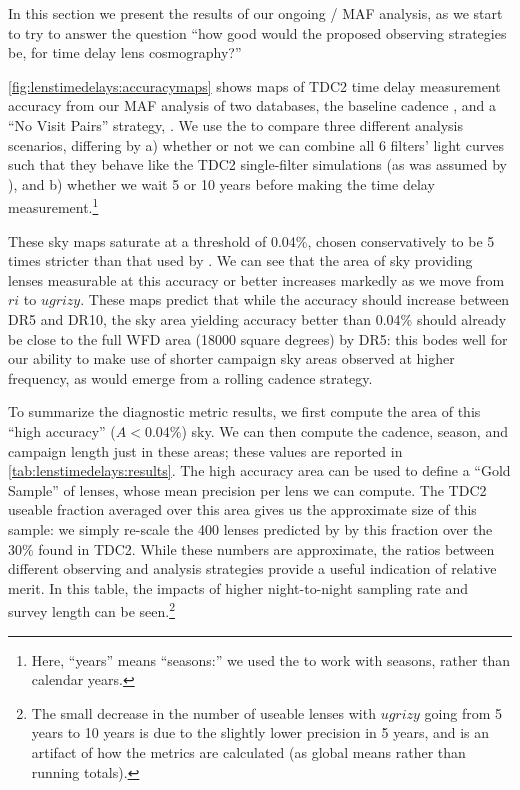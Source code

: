 
In this section we present the results of our ongoing \OpSim / MAF
analysis, as we start to try to
answer the question ``how good would the proposed observing
strategies be, for time delay lens cosmography?''

\autoref{fig:lenstimedelays:accuracymaps} shows maps of TDC2 time delay
measurement accuracy from our MAF analysis of two \OpSim databases, the
baseline cadence , and a ``No Visit Pairs''
strategy, . We use the  to compare three different
analysis scenarios, differing by a) whether or not we can combine all 6
filters' light curves such that they behave like the TDC2 single-filter
simulations (as was assumed by \citeauthor{LiaoEtal2015}), and b)
whether we wait 5 or 10 years before making the time delay measurement.\footnote{Here, ``years'' means ``seasons:'' we used the
 to work
with seasons, rather than calendar years.}

These sky maps saturate at a threshold of 0.04\%, chosen conservatively
to be 5 times stricter than that used by
\citeauthor{Hojjati+Linder2014}. We can see that the area of sky
providing lenses measurable at this accuracy or better increases
markedly as we move from $ri$ to $ugrizy$. These maps predict that while
the accuracy should increase between DR5 and DR10, the sky area yielding
accuracy better than 0.04\% should already be close to the full WFD area
(18000 square degrees) by DR5: this bodes well for our ability to make
use of shorter campaign sky areas observed at higher frequency, as would
emerge from a rolling cadence strategy.

To summarize the diagnostic metric results, we first compute the area of
this ``high accuracy'' ($A < 0.04\%$) sky. We can then compute the cadence, season, and
campaign length just in these areas; these values are reported in
\autoref{tab:lenstimedelays:results}. The high accuracy area can be used
to define a ``Gold Sample'' of lenses, whose mean precision per lens we
can compute. The TDC2 useable fraction averaged over this area gives us
the approximate size of this sample: we simply re-scale the 400 lenses
predicted by \citet{LiaoEtal2015} by this fraction over the 30\% found
in TDC2. While these numbers are approximate, the ratios between
different observing and analysis strategies provide a useful indication of relative merit. In this table, the impacts of higher night-to-night sampling rate and survey length can be seen.\footnote{The small decrease in the number of useable lenses with $ugrizy$ going from 5 years to 10 years is due to the slightly lower precision in 5 years, and is an artifact of how the metrics are calculated (as global means rather than running totals).}


